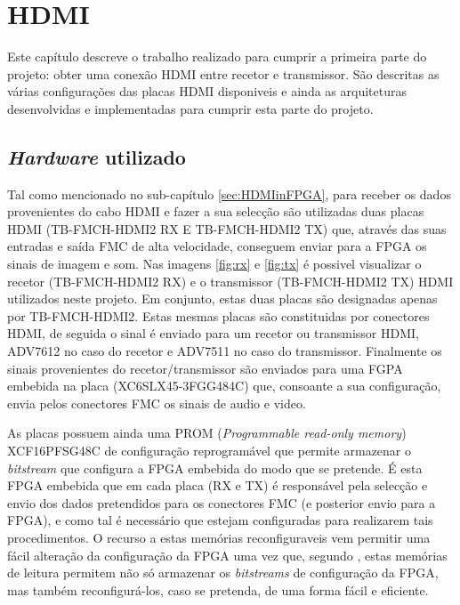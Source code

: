 \chapter{HDMI}\label{chap:chap3}

Este capítulo descreve o trabalho realizado para cumprir a primeira parte do projeto: obter uma conexão HDMI entre recetor e transmissor. São descritas as várias configurações das placas HDMI disponiveis e ainda as arquiteturas desenvolvidas e implementadas para cumprir esta parte do projeto. 

\section{\textit{Hardware} utilizado} \label{sec:hardware}

Tal como mencionado no sub-capítulo \ref{sec:HDMIinFPGA}, para receber os dados provenientes do cabo HDMI e fazer a sua selecção são utilizadas duas placas HDMI (TB-FMCH-HDMI2 RX E TB-FMCH-HDMI2 TX) que, através das suas entradas e saída FMC de alta velocidade, conseguem enviar para a FPGA os sinais de imagem e som. Nas imagens \ref{fig:rx} e \ref{fig:tx} é possivel visualizar o recetor (TB-FMCH-HDMI2 RX) e o transmissor (TB-FMCH-HDMI2 TX) HDMI utilizados neste projeto. Em conjunto, estas duas placas são designadas apenas por TB-FMCH-HDMI2. Estas mesmas placas são constituidas por conectores HDMI, de seguida o sinal é enviado para um recetor ou transmissor HDMI, ADV7612 no caso do recetor e ADV7511 no caso do transmissor. Finalmente os sinais provenientes do recetor/transmissor são enviados para uma FGPA embebida na placa (XC6SLX45-3FGG484C) que, consoante a sua configuração, envia pelos conectores FMC os sinais de audio e video.

As placas possuem ainda uma PROM (\textit{Programmable read-only memory}) XCF16PFSG48C de configuração reprogramável que permite armazenar o \textit{bitstream} que configura a FPGA embebida do modo que se pretende. É esta FPGA embebida que em cada placa (RX e TX) é responsável pela selecção e envio dos dados pretendidos para os conectores FMC (e posterior envio para a FPGA), e como tal é necessário que estejam configuradas para realizarem tais procedimentos. O recurso a estas memórias reconfiguraveis vem permitir uma fácil alteração da configuração da FPGA uma vez que, segundo \cite{R026}, estas memórias de leitura permitem não só armazenar os \textit{bitstreams} de configuração da FPGA, mas também reconfigurá-los, caso se pretenda, de uma forma fácil e eficiente.

